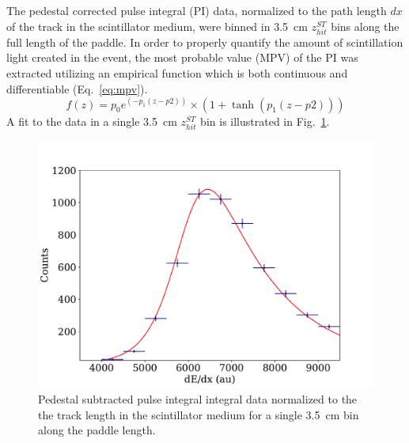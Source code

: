 The pedestal corrected pulse integral (PI) data, normalized to the path length $dx$ of the track in the scintillator medium, were binned in 3.5~cm $z^{ST}_{hit}$ bins along the full length of the paddle. In order to properly quantify the amount of scintillation light created in the event, the most probable value (MPV) of the PI was extracted utilizing an empirical function which is both continuous and differentiable (Eq.~\ref{eq:mpv}).
	\begin{equation}\label{eq:mpv}
	f(z)  = p_0 e^{(-p_1(z - p2))} \times (1+ \tanh(p_1(z - p2))) 
	\end{equation}
A fit to the data in a single 3.5~cm $z^{ST}_{hit}$ bin is illustrated in Fig.~\ref{fig:mpv_fit}. 
	\begin{figure}[!htb]
	\centering
	\includegraphics[width=1.0\columnwidth]{calibration/figs/FitMPV.pdf}
	\caption{Pedestal subtracted pulse integral integral data normalized to the the track length in the scintillator medium for a single 3.5~cm bin along the paddle length.}
	\label{fig:mpv_fit}
	\end{figure}
